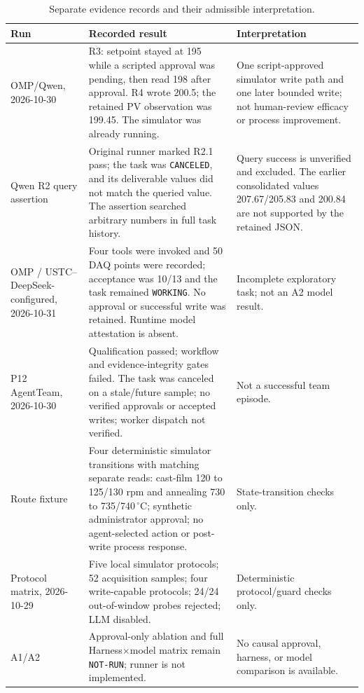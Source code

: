 \documentclass[journal]{IEEEtran}
\begin{document}
\begin{table}[!t]
\centering
\caption{Separate evidence records and their admissible interpretation.}
\label{tab:s5-runs}
\footnotesize
\setlength{\tabcolsep}{4pt}
\begin{tabularx}{\textwidth}{@{}p{2.2cm}X p{3.3cm}@{}}
\toprule
Run & Recorded result & Interpretation \\
\midrule
OMP/Qwen, 2026-10-30 & R3: setpoint stayed at 195 while a scripted approval was pending, then read 198 after approval. R4 wrote 200.5; the retained PV observation was 199.45. The simulator was already running. & One script-approved simulator write path and one later bounded write; not human-review efficacy or process improvement. \\
Qwen R2 query assertion & Original runner marked R2.1 pass; the task was \texttt{CANCELED}, and its deliverable values did not match the queried value. The assertion searched arbitrary numbers in full task history. & Query success is unverified and excluded. The earlier consolidated values 207.67/205.83 and 200.84 are not supported by the retained JSON. \\
OMP / USTC--DeepSeek-configured, 2026-10-31 & Four tools were invoked and 50 DAQ points were recorded; acceptance was 10/13 and the task remained \texttt{WORKING}. No approval or successful write was retained. Runtime model attestation is absent. & Incomplete exploratory task; not an A2 model result. \\
P12 AgentTeam, 2026-10-30 & Qualification passed; workflow and evidence-integrity gates failed. The task was canceled on a stale/future sample; no verified approvals or accepted writes; worker dispatch not verified. & Not a successful team episode. \\
Route fixture & Four deterministic simulator transitions with matching separate reads: cast-film 120 to 125/130 rpm and annealing 730 to 735/740\,$^{\circ}$C; synthetic administrator approval; no agent-selected action or post-write process response. & State-transition checks only. \\
Protocol matrix, 2026-10-29 & Five local simulator protocols; 52 acquisition samples; four write-capable protocols; 24/24 out-of-window probes rejected; LLM disabled. & Deterministic protocol/guard checks only. \\
A1/A2 & Approval-only ablation and full Harness$\times$model matrix remain \texttt{NOT-RUN}; runner is not implemented. & No causal approval, harness, or model comparison is available. \\
\bottomrule
\end{tabularx}
\end{table}
\end{document}
